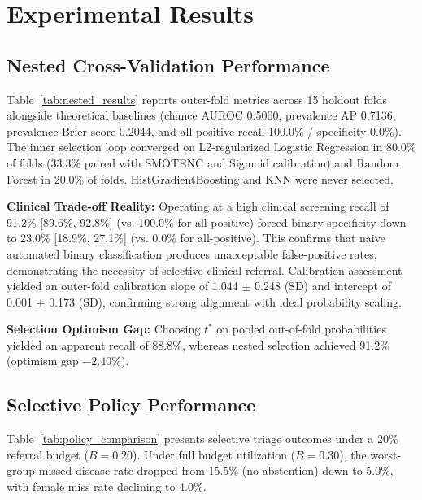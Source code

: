 \documentclass[11pt,a4paper]{article}
\begin{document}
\section{Experimental Results}

\subsection{Nested Cross-Validation Performance}
Table~\ref{tab:nested_results} reports outer-fold metrics across 15 holdout folds alongside theoretical baselines (chance AUROC 0.5000, prevalence AP 0.7136, prevalence Brier score 0.2044, and all-positive recall 100.0\% / specificity 0.0\%). The inner selection loop converged on L2-regularized Logistic Regression in 80.0\% of folds (33.3\% paired with SMOTENC and Sigmoid calibration) and Random Forest in 20.0\% of folds. HistGradientBoosting and KNN were never selected.



\noindent\textbf{Clinical Trade-off Reality:} Operating at a high clinical screening recall of 91.2\% [89.6\%, 92.8\%] (vs. 100.0\% for all-positive) forced binary specificity down to 23.0\% [18.9\%, 27.1\%] (vs. 0.0\% for all-positive). This confirms that naive automated binary classification produces unacceptable false-positive rates, demonstrating the necessity of selective clinical referral. Calibration assessment yielded an outer-fold calibration slope of 1.044 $\pm$ 0.248 (SD) and intercept of 0.001 $\pm$ 0.173 (SD), confirming strong alignment with ideal probability scaling.

\noindent\textbf{Selection Optimism Gap:} Choosing $t^*$ on pooled out-of-fold probabilities yielded an apparent recall of 88.8\%, whereas nested selection achieved 91.2\% (optimism gap $-2.40\%$).

\subsection{Selective Policy Performance}
Table~\ref{tab:policy_comparison} presents selective triage outcomes under a 20\% referral budget ($B=0.20$). Under full budget utilization ($B=0.30$), the worst-group missed-disease rate dropped from 15.5\% (no abstention) down to 5.0\%, with female miss rate declining to 4.0\%.


\end{document}

